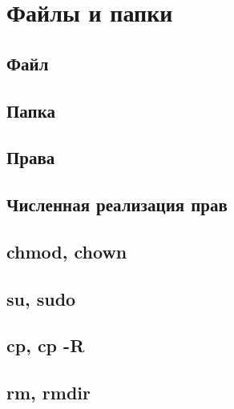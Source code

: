 \section{Файлы и папки}

\subsection{Файл}
\subsection{Папка}
\subsection{Права}
\subsection{Численная реализация прав}
\subsection{chmod, chown}
\subsection{su, sudo}
\subsection{cp, cp -R}
\subsection{rm, rmdir}






\newpage